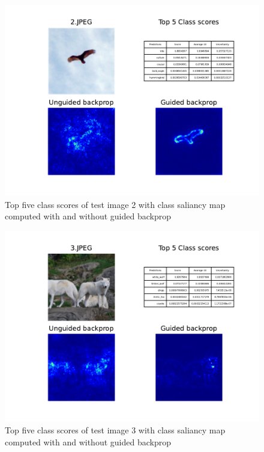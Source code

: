 \documentclass{article}
\begin{document}
\begin{figure}[h]
    \begin{center}
        \includegraphics{../Task2/Figures/2.JPEG_k10_saliancy_uncertainty.pdf}
        \caption{Top five class scores of test image 2 with class saliancy map computed with and without guided backprop}
        \label{fig::image2}
    \end{center}
\end{figure}
\begin{figure}[h]
    \begin{center}
        \includegraphics{../Task2/Figures/3.JPEG_k10_saliancy_uncertainty.pdf}
        \caption{Top five class scores of test image 3 with class saliancy map computed with and without guided backprop}
        \label{fig::image3}
    \end{center}
\end{figure}
\end{document}
